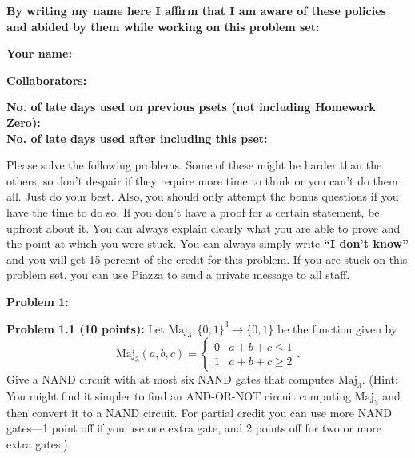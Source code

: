 \documentclass[11pt]{article}
\begin{document}
	\textbf{By writing my name here I affirm that I am aware of these policies
		and abided by them while working on this problem set:}
	
	\textbf{Your name:} %
	
	\textbf{Collaborators:} %
	
	\textbf{No. of late days used on previous psets (not including Homework Zero): %
}\\
	\textbf{No. of late days used after including this pset: %
}
	
	
	\newpage

{\color{red} Please solve the following problems. Some of these might be harder than
the others, so don't despair if they require more time to think or you
can't do them all. Just do your best. Also, you should only attempt the
bonus questions if you have the time to do so. If you don't have a proof
for a certain statement, be upfront about it. You can always explain
clearly what you are able to prove and the point at which you were
stuck. 
You can always simply write
\textbf{``I don't know''} and you will get 15 percent of the credit for
this problem. If you are stuck on this problem set, you can use Piazza to
send a private message to all staff.}


\newcommand{\Maj}{\mathrm{Maj}}
\newcommand{\Comp}{\mathrm{Comp}}
\textbf{Problem 1:} 

\textbf{Problem 1.1 (10 points):} Let $\Maj_3:\{0,1\}^3 \to \{0,1\}$ be the function given by 
$$\Maj_3(a,b,c) =
\begin{cases}
0 & a + b + c \le 1\\
1 & a + b + c \ge 2
\end{cases}.$$ 
Give a NAND circuit with at most six NAND gates that computes $\Maj_3$. (Hint: You might find it simpler to find an AND-OR-NOT circuit computing $\Maj_3$ and then convert it to a NAND circuit. For partial credit you can use more NAND gates---1 point off if you use one extra gate, and 2 points off for two or more extra gates.)
\end{document}
